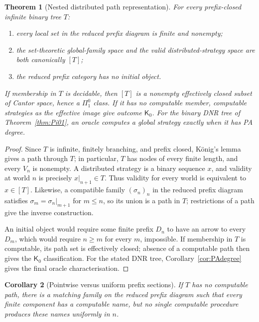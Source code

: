 \documentclass[11pt]{article}
\theoremstyle{plain}
\newtheorem{theorem}{Theorem}[section]
\newtheorem{corollary}[theorem]{Corollary}
\theoremstyle{definition}
\theoremstyle{remark}
\begin{document}
\begin{theorem}[Nested distributed path representation]
\label{thm:nested-distributed-K}
For every prefix-closed infinite binary tree $T$:
\begin{enumerate}[label=(\roman*)]
\item every local set in the reduced prefix diagram is finite and nonempty;
\item the set-theoretic global-family space and the valid distributed-strategy
space are both canonically $[T]$;
\item the reduced prefix category has no initial object.
\end{enumerate}
If membership in $T$ is decidable, then $[T]$ is a nonempty effectively closed
subset of Cantor space, hence a $\Pi^0_1$ class. If it has no computable member,
computable strategies as the effective image give outcome $\mathsf K_0$. For the
binary DNR tree of Theorem~\ref{thm:Pi01}, an oracle computes a global strategy
exactly when it has PA degree.
\end{theorem}

\begin{proof}
Since $T$ is infinite, finitely branching, and prefix closed, König's lemma gives
a path through $T$; in particular, $T$ has nodes of every finite length, and
every $V_n$ is nonempty. A distributed strategy is a binary
sequence $x$, and validity at world $n$ is precisely
$x|_{n+1}\in T$. Thus validity for every world is equivalent to $x\in[T]$.
Likewise, a compatible family $(\sigma_n)_n$ in the reduced prefix diagram
satisfies $\sigma_m=\sigma_n|_{m+1}$ for $m\le n$, so its union is a path in
$T$; restrictions of a path give the inverse construction.

An initial object would require
some finite prefix $D_n$ to have an arrow to every $D_m$, which would require
$n\ge m$ for every $m$, impossible. If membership in $T$ is computable, its
path set is effectively closed; absence of a computable path then gives the
$\mathsf K_0$ classification. For the stated DNR tree,
Corollary~\ref{cor:PAdegree} gives the final oracle characterisation.
\end{proof}

\begin{corollary}[Pointwise versus uniform prefix sections]
\label{cor:nested-nonuniform}
If $T$ has no computable path, there is a matching family on the reduced prefix
diagram such that every finite component has a computable name, but no single
computable procedure produces these names uniformly in $n$.
\end{corollary}
\end{document}
